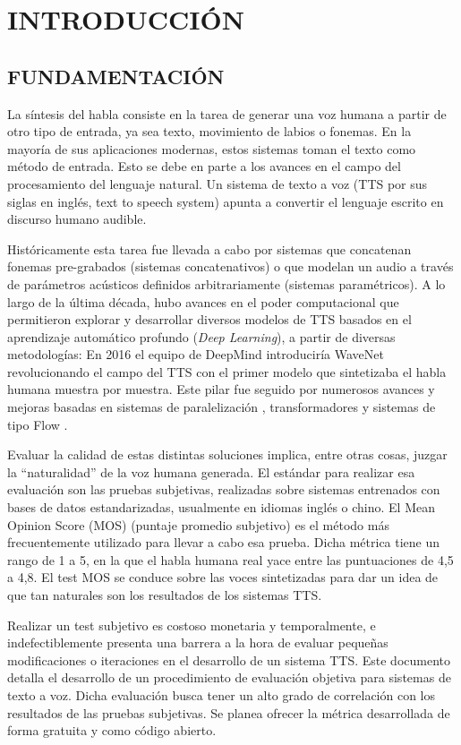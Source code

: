 \section{INTRODUCCIÓN}
\subsection{FUNDAMENTACIÓN}
La síntesis del habla consiste en la tarea de generar una voz humana a partir de otro tipo de entrada, ya sea texto, movimiento de labios o fonemas. En la mayoría de sus aplicaciones modernas, estos sistemas toman el texto como método de entrada. Esto se debe en parte a los avances en el campo del procesamiento del lenguaje natural. Un sistema de texto a voz (TTS por sus siglas en inglés, text to speech system) apunta a convertir el lenguaje escrito en discurso humano audible.

Históricamente esta tarea fue llevada a cabo por sistemas que concatenan fonemas pre-grabados (sistemas concatenativos) o que modelan un audio a través de parámetros acústicos definidos arbitrariamente (sistemas paramétricos). A lo largo de la última década, hubo avances en el poder computacional que permitieron explorar y desarrollar diversos modelos de TTS basados en el aprendizaje automático profundo (\textit{Deep Learning}), a partir de diversas metodologías: En 2016 el equipo de DeepMind introduciría WaveNet \cite{wavenet} revolucionando el campo del TTS con el primer modelo que sintetizaba el habla humana muestra por muestra. Este pilar fue seguido por numerosos avances y mejoras basadas en sistemas de paralelización \cite{paralel}, transformadores \cite{fastspeech} y sistemas de tipo Flow \cite{waveglow}.

Evaluar la calidad de estas distintas soluciones implica, entre otras cosas, juzgar la “naturalidad” de la voz humana generada. El estándar para realizar esa evaluación son las pruebas subjetivas, realizadas sobre sistemas entrenados con bases de datos estandarizadas, usualmente en idiomas inglés o chino. El Mean Opinion Score (MOS) \cite{itu} (puntaje promedio subjetivo) es el método más frecuentemente utilizado para llevar a cabo esa prueba. Dicha métrica tiene un rango de 1 a 5, en la que el habla humana real yace entre las puntuaciones de 4,5 a 4,8. El test MOS se conduce sobre las voces sintetizadas para dar un idea de que tan naturales son los resultados de los sistemas TTS.

Realizar un test subjetivo es costoso monetaria y temporalmente, e indefectiblemente presenta una barrera a la hora de evaluar pequeñas modificaciones o iteraciones en el desarrollo de un sistema TTS. Este documento detalla el desarrollo de un procedimiento de evaluación objetiva para sistemas de texto a voz. Dicha evaluación busca tener un alto grado de correlación con los resultados de las pruebas subjetivas. Se planea ofrecer la métrica desarrollada de forma gratuita y como código abierto.

